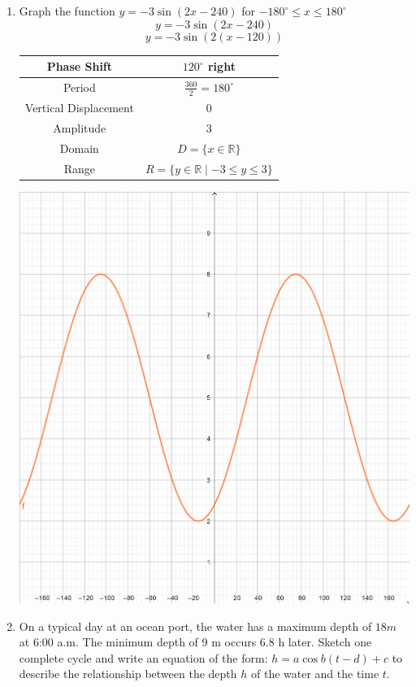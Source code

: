 \documentclass[paper=a4, fontsize=11pt]{scrartcl}
\begin{document}
\begin{enumerate}[resume]
    \item Graph the function $y=-3\sin(2x-240)$ for $-180^\circ\le x \le 180^\circ$
    $$y=-3\sin(2x-240)$$
    $$y=-3\sin(2(x-120))$$
    \begin{center}
        \begin{tabular}{|c|c|}
            \hline
            Phase Shift &$120^\circ$ right\\
            \hline
            Period &$\frac{360}{2}=180^\circ$\\
            \hline
            Vertical Displacement &$0$\\
            \hline
            Amplitude &$3$\\
            \hline
            Domain &$D=\{x\in\mathbb{R}\}$\\
            \hline
            Range &$R=\{y\in\mathbb{R}\mid -3\le y \le 3\}$\\
            \hline
        \end{tabular}
    \end{center}
    \begin{center}
        \includegraphics[scale=0.01]{MathExamReview/23-graph.png}
    \end{center}
    \item On a typical day at an ocean port, the water has a maximum depth of $18m$ at 6:00 a.m. The minimum depth of 9 m occurs 6.8 h later. Sketch one complete cycle and write an equation of the form: $h=a\cos b(t-d)+c$ to describe the relationship between the depth $h$ of the water and the time $t$.

\end{enumerate}
\end{document}
